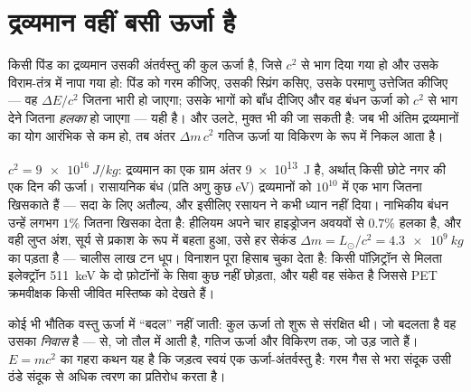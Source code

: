 \section{द्रव्यमान वहीं बसी ऊर्जा है}

\begin{theorem}[द्रव्यमान--ऊर्जा तुल्यता]\label{thm:b3:relativistic-dynamics:emc2}
किसी पिंड का द्रव्यमान उसकी अंतर्वस्तु की कुल ऊर्जा है, जिसे
$c^2$ से भाग दिया गया हो और उसके विराम-तंत्र में नापा गया हो: पिंड को
गरम कीजिए, उसकी स्प्रिंग कसिए, उसके परमाणु उत्तेजित कीजिए --- वह
$\Delta E/c^2$ जितना भारी हो जाएगा; उसके भागों को बाँध दीजिए और वह
बंधन ऊर्जा को $c^2$ से भाग देने जितना \emph{हलका} हो जाएगा --- यही
\emph{} है। और उलटे,  मुक्त भी की जा सकती है:
जब भी अंतिम द्रव्यमानों का योग आरंभिक से कम हो, तब
अंतर $\Delta m\,c^2$ गतिज ऊर्जा या विकिरण के रूप में निकल आता है।
\end{theorem}
\admitted

\begin{example}[$c^2$ का बहीखाता]\label{ex:b3:relativistic-dynamics:ledger}
$c^2 = \qty{9e16}{J/kg}$: द्रव्यमान का एक ग्राम अंतर
\qty{9e13}{J} है, अर्थात् किसी छोटे नगर की एक दिन की ऊर्जा। रासायनिक
बंध (प्रति अणु कुछ eV) द्रव्यमानों को $10^{10}$ में एक भाग जितना
खिसकाते हैं --- सदा के लिए अतौल्य, और इसीलिए रसायन ने कभी ध्यान नहीं
दिया। नाभिकीय बंधन उन्हें लगभग $1\%$ जितना खिसका देता है: हीलियम अपने
चार हाइड्रोजन अवयवों से $0.7\%$ हलका है, और वही लुप्त अंश, सूर्य से
प्रकाश के रूप में बहता हुआ, उसे हर सेकंड $\Delta m = L_\odot/c^2 =
\qty{4.3e9}{kg}$ का पड़ता है --- चालीस लाख टन धूप। विनाशन पूरा
हिसाब चुका देता है: किसी पॉज़िट्रॉन से मिलता इलेक्ट्रॉन
\qty{511}{keV} के दो फ़ोटॉनों के सिवा कुछ नहीं छोड़ता, और यही वह संकेत
है जिससे PET क्रमवीक्षक किसी जीवित मस्तिष्क को देखते हैं।
\end{example}

\begin{remark}[``परिवर्तन'' का अर्थ क्या है]\label{rem:b3:relativistic-dynamics:conversion}
कोई भी भौतिक वस्तु ऊर्जा में ``बदल'' नहीं जाती: कुल ऊर्जा तो शुरू से
संरक्षित थी। जो बदलता है वह उसका \emph{निवास} है ---  से,
जो तौल में आती है, गतिज ऊर्जा और विकिरण तक, जो उड़ जाते हैं।
$E = mc^2$ का गहरा कथन यह है कि जड़त्व स्वयं एक ऊर्जा-अंतर्वस्तु है:
गरम गैस से भरा संदूक उसी ठंडे संदूक से अधिक त्वरण का प्रतिरोध करता है।
\end{remark}

